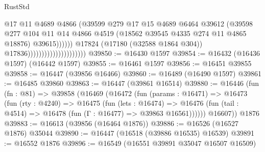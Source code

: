 \begin{lexlean}{RustStd}
\begin{coremodule}
{\begin{coremodule}
{{{{{{{{{{{{{{{{{{{{{{{{{{{{{{{{{{{{{{{{{{{{{{{{{{{{{{{                                                      @17
                                                      @11
                                                      @4689
                                                      @4866
                                                      (@39599
                                                        @279
                                                        @17
                                                        @15
                                                        @4689
                                                        @6464
                                                        @39612
                                                        (@39598
                                                          @277
                                                          @104
                                                          @11
                                                          @14
                                                          @4866
                                                          @4519
                                                          (@18562
                                                            @39545
                                                            @4335
                                                            @274
                                                            @11
                                                            @4865
                                                            @18876)
                                                          @39615))))))
                                              @17824
                                              (@17180 (@32588 @1864 @304))
                                              @17836)))))))))))))))))))))
@39850 := @16430 @1597
@39854 := @16432 (@16436 @1597) (@16442 @1597)
@39855 := @16461 @1597
@39856 := @16451 @39855
@39858 := @16447 (@39856 @16466)
@39860 := @16489 (@16490 @1597)
@39861 := @16485 @39860
@39863 := @16447 (@39861 @16514)
@39880 := @16446
    (fun (fn : @81) =>
    @39858
      (@16469
        (@16472
          (fun (params : @16471) =>
          @16473
            (fun (rty : @4240) =>
            @16475
              (fun (lets : @16474) =>
              @16476 (fun (tail : @4514) => @16478 (fun (Γ : @16477) => @39863 @16561))))))
        @16607))
    @1876
@39883 := @16613 (@39856 (@16464 @1876))
@39886 := @16526 (@16527 @1876) @35044
@39890 := @16447 (@16518 (@39886 @16535) @16539)
@39891 := @16552 @1876
@39896 := @16549 (@16551 @39891 @35047 @16507 @16509)
}}}}}}}}}}}}}}}}}}}}}}}}}}}}}}}}}}}}}}}}}}}}}}}}}}}}}}}
\end{coremodule}}
\end{coremodule}
\end{lexlean}
